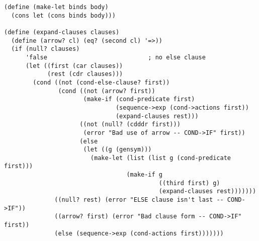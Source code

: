 \documentclass[a4paper,12pt]{article}
\begin{document}
\begin{lstlisting}
(define (make-let binds body)
  (cons let (cons binds body)))

(define (expand-clauses clauses)
  (define (arrow? cl) (eq? (second cl) '=>))
  (if (null? clauses)
      'false                            ; no else clause
      (let ((first (car clauses))
            (rest (cdr clauses)))
        (cond ((not (cond-else-clause? first))
               (cond ((not (arrow? first))
                      (make-if (cond-predicate first)
                               (sequence->exp (cond->actions first))
                               (expand-clauses rest)))
                     ((not (null? (cdddr first)))
                      (error "Bad use of arrow -- COND->IF" first))
                     (else
                      (let ((g (gensym)))
                        (make-let (list (list g (cond-predicate first)))
                                  (make-if g
                                           ((third first) g)
                                           (expand-clauses rest)))))))
              ((null? rest) (error "ELSE clause isn't last -- COND->IF"))
              ((arrow? first) (error "Bad clause form -- COND->IF" first))
              (else (sequence->exp (cond-actions first)))))))
\end{lstlisting}
\end{document}
